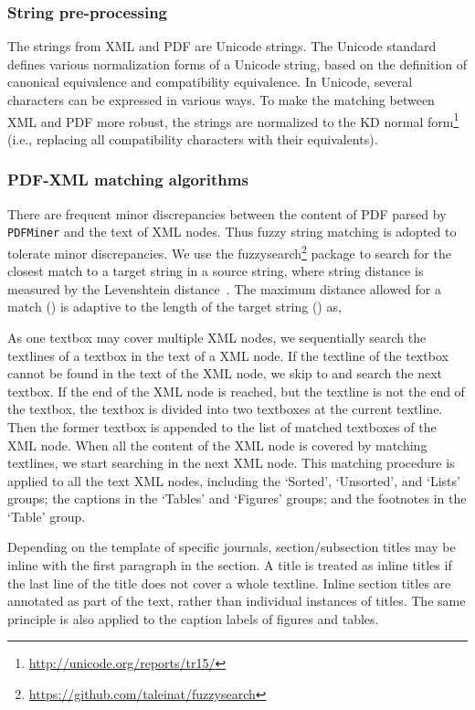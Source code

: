 \documentclass[conference]{IEEEtran}
\begin{document}
\subsubsection{String pre-processing}

The strings from XML and PDF are Unicode strings. The Unicode standard defines various normalization forms of a Unicode string, based on the definition of canonical equivalence and compatibility equivalence. In Unicode, several characters can be expressed in various ways. To make the matching between XML and PDF more robust, the strings are normalized to the KD normal form\footnote{\url{http://unicode.org/reports/tr15/}} (i.e., replacing all compatibility characters with their equivalents).

\subsubsection{PDF-XML matching algorithms}

There are frequent minor discrepancies between the content of PDF parsed by \texttt{PDFMiner} and the text of XML nodes. Thus fuzzy string matching is adopted to tolerate minor discrepancies. We use the fuzzysearch\footnote{\url{https://github.com/taleinat/fuzzysearch}} package to search for the closest match to a target string in a source string, where string distance is measured by the Levenshtein distance~\cite{levenshtein1966binary}. The maximum distance allowed for a match () is adaptive to the length of the target string () as,


As one textbox may cover multiple XML nodes, we sequentially search the textlines of a textbox in the text of a XML node. If the textline of the textbox cannot be found in the text of the XML node, we skip to and search the next textbox. If the end of the XML node is reached, but the textline is not the end of the textbox, the textbox is divided into two textboxes at the current textline. Then the former textbox is appended to the list of matched textboxes of the XML node. When all the content of the XML node is covered by matching textlines, we start searching in the next XML node. This matching procedure is applied to all the text XML nodes, including the `Sorted', `Unsorted', and `Lists' groups; the captions in the `Tables' and `Figures' groups; and the footnotes in the `Table' group.

Depending on the template of specific journals, section/subsection titles may be inline with the first paragraph in the section. A title is treated as inline titles if the last line of the title does not cover a whole textline. Inline section titles are annotated as part of the text, rather than individual instances of titles. The same principle is also applied to the caption labels of figures and tables.
\end{document}
